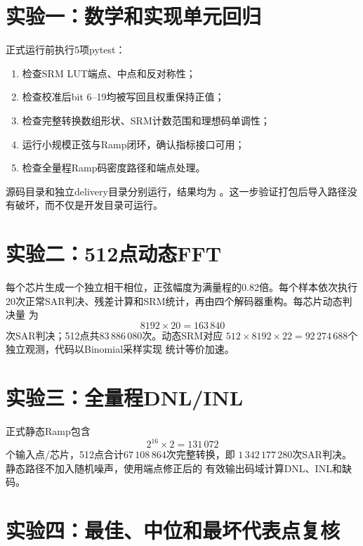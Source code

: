 \documentclass[11pt,a4paper,UTF8,fontset=none,openany]{ctexrep}
\numberwithin{equation}{chapter}
\numberwithin{figure}{chapter}
\numberwithin{table}{chapter}
\begin{document}
\section{实验一：数学和实现单元回归}

正式运行前执行5项pytest：

\begin{enumerate}
  \item 检查SRM LUT端点、中点和反对称性；
  \item 检查校准后bit 6--19均被写回且权重保持正值；
  \item 检查完整转换数组形状、SRM计数范围和理想码单调性；
  \item 运行小规模正弦与Ramp闭环，确认指标接口可用；
  \item 检查全量程Ramp码密度路径和端点处理。
\end{enumerate}

源码目录和独立delivery目录分别运行，结果均为
。这一步验证打包后导入路径没有破坏，而不仅是开发目录可运行。

\section{实验二：512点动态FFT}

每个芯片生成一个独立相干相位，正弦幅度为满量程的0.82倍。每个样本依次执行
20次正常SAR判决、残差计算和SRM统计，再由四个解码器重构。每芯片动态判决量
为
\begin{equation}
  8192\times 20=163\,840
  \label{eq:dynamic-decisions-chip}
\end{equation}
次SAR判决；512点共$83\,886\,080$次。动态SRM对应
$512\times8192\times22=92\,274\,688$个独立观测，代码以Binomial采样实现
统计等价加速。

\section{实验三：全量程DNL/INL}

正式静态Ramp包含
\begin{equation}
  2^{16}\times 2=131\,072
  \label{eq:ramp-samples}
\end{equation}
个输入点/芯片，512点合计$67\,108\,864$次完整转换，即
$1\,342\,177\,280$次SAR判决。静态路径不加入随机噪声，使用端点修正后的
有效输出码域计算DNL、INL和缺码。

\section{实验四：最佳、中位和最坏代表点复核}
\end{document}
